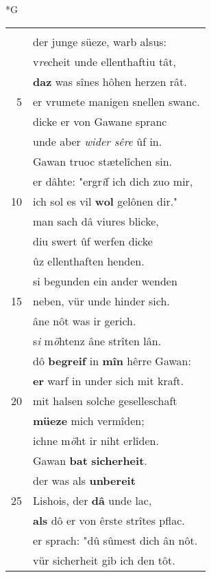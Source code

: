 \documentclass[8pt,a4paper,notitlepage]{article}
\begin{document}
\begin{table}[ht]
\begin{minipage}[t]{0.5\linewidth}
\small
\begin{center}*G
\end{center}
\begin{tabular}{rl}
 & \textit{\begin{large}L\end{large}}ishois Gewellius,\\ 
 & der junge süeze, warb alsus:\\ 
 & v\textit{re}cheit unde ellenthaftiu tât,\\ 
 & \textbf{daz} was sînes hôhen herzen rât.\\ 
5 & er vrumete manigen snellen swanc.\\ 
 & dicke er von Gawane spranc\\ 
 & unde aber \textit{wider sêre} ûf in.\\ 
 & Gawan truoc stætelîchen sin.\\ 
 & er dâhte: "ergr\textit{î}f ich dich zuo mir,\\ 
10 & ich sol es vil \textbf{wol} gelônen dir."\\ 
 & man sach dâ viures blicke,\\ 
 & diu swert ûf werfen dicke\\ 
 & ûz ellenthaften henden.\\ 
 & si begunden ein ander wenden\\ 
15 & neben, vür unde hinder sich.\\ 
 & âne nôt was ir gerich.\\ 
 & s\textit{i} m\textit{ö}htenz âne strîten lân.\\ 
 & dô \textbf{begreif} in \textbf{mîn} hêrre Gawan:\\ 
 & \textbf{er} warf in under sich mit kraft.\\ 
20 & mit halsen solche geselleschaft\\ 
 & \textbf{müeze} mich vermîden;\\ 
 & ichne m\textit{ö}ht ir niht erlîden.\\ 
 & Gawan \textbf{bat} \textbf{sicherheit}.\\ 
 & der was als \textbf{unbereit}\\ 
25 & Lishois, der \textbf{dâ} unde lac,\\ 
 & \textbf{als} dô er von êrste strîtes pflac.\\ 
 & er sprach: "dû sûmest dich ân nôt.\\ 
 & vür sicherheit gib ich den tôt.\\ 

\end{tabular}
\end{minipage}
\end{table}
\end{document}
